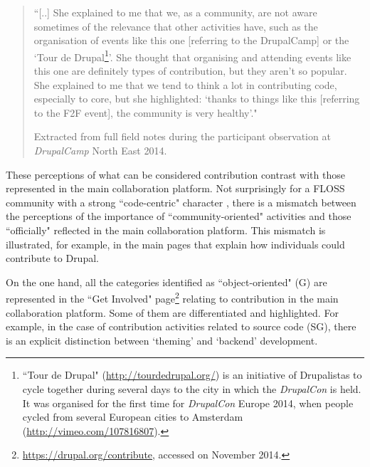 \begin{quotation}
    ``[..] She explained to me that we, as a community, are not aware sometimes of the relevance that other activities have, such as the organisation of events like this one [referring to the DrupalCamp] or the `Tour de Drupal\footnote{\label{footnote-drupal} ``Tour de Drupal" (\url{http://tourdedrupal.org/}) is an initiative of Drupalistas to cycle together during several days to the city in which the \textit{DrupalCon} is held. It was organised for the first time for \textit{DrupalCon} Europe 2014, when people cycled from several European cities to Amsterdam (\url{http://vimeo.com/107816807}).}'. She thought that organising and attending events like this one are definitely types of contribution, but they aren't so popular. She explained to me that we tend to think a lot in contributing code, especially to core, but she highlighted: `thanks to things like this [referring to the F2F event], the community is very healthy'."

\begin{flushright}\footnotesize{Extracted from full field notes during the participant observation at \textit{DrupalCamp} North East 2014.}\end{flushright}
    \end{quotation}

These perceptions of what can be considered contribution contrast with those represented in the main collaboration platform. Not surprisingly for a FLOSS community with a strong ``code-centric" character \parencite{Zilouchian2011, Sims2013}, there is a mismatch between the perceptions of the importance of ``community-oriented" activities and those ``officially" reflected in the main collaboration platform. This mismatch is illustrated, for example, in the main pages that explain how individuals could contribute to Drupal.

On the one hand, all the categories identified as ``object-oriented" (G) are represented in the ``Get Involved" page\footnote{\url{https://drupal.org/contribute}, accessed on  November 2014.} relating to contribution in the main collaboration platform.  Some of them are differentiated and highlighted. For example, in the case of contribution activities related to source code (SG), there is an explicit distinction between `theming' and `backend' development.

